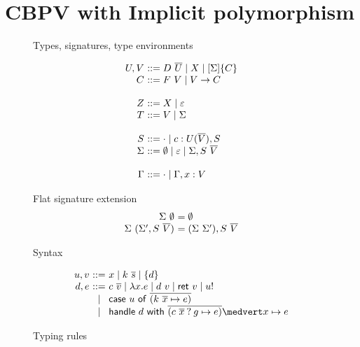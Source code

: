 \documentclass[preprint]{sigplanconf}
\newcommand{\many}{\overline}
\newcommand{\sig}{S}
\newcommand{\sigs}{\Sigma}
\newcommand{\effbox}[1]{[#1]}
\newcommand{\keyword}[1]{\mathsf{#1}}
\newcommand{\handleSymbol}{\mathbin{?}}
\newcommand{\handle}[2]{{#1} \handleSymbol {#2}}
\newcommand{\thunk}[1]{\{{#1}\}}
\newcommand{\force}[1]{{#1}!}
\begin{document}


\section{CBPV with Implicit polymorphism}

\begin{figure*}

Types, signatures, type environments

\[
\begin{array}{@{}r@{~}l@{}}
U, V &::= D~\many{U} \mid X \mid \effbox{\sigs}\thunk{C} \\
C    &::= F~V \mid V \to C \\
\\
Z    &::= X \mid \varepsilon \\
T    &::= V \mid \sigs \\
\\
\sig  &::= \cdot \mid c : U(\many{V}), \sig \\
\sigs &::=
  \emptyset \mid \varepsilon \mid \sigs, \sig~\many{V} \\
\\
\Gamma &::= \cdot \mid \Gamma, x:V \\
\end{array}
\]

Flat signature extension
\[
\begin{array}{@{}r@{~}l@{}}
\sigs~\emptyset &= \emptyset \\
\sigs~(\sigs', \sig~\many{V}) &= (\sigs~\sigs'), \sig~\many{V} \\
\end{array}
\]

Syntax

\[
\begin{array}{@{}r@{~}c@{~}l@{}}
u, v &::=& x \mid k~\many{s} \mid \thunk{d}  \\ %
d, e &::=& c~\many{v}                        %
   \mid \lambda x.e \mid d~v \mid \keyword{ret}~v \mid \force{u} \\
  &\mid& \keyword{case}~u~\keyword{of}~
           \many{(k~\many{x} \mapsto e)} \\
  &\mid& \keyword{handle} ~d~ \keyword{with}~
           \many{(\handle{c~\many{x}}{g} \mapsto e)} \medvert
            x        \mapsto e \\
\end{array}
\]

Typing rules
\medskip


\end{figure*}
\end{document}
